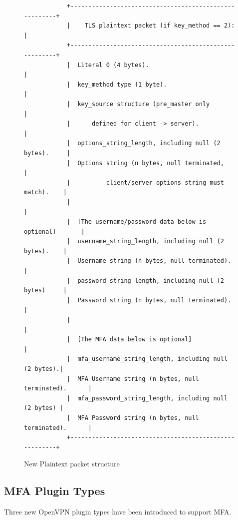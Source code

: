 \documentclass[11pt,oneside]{book}
\begin{document}
\begin{figure}[t]
    \label{MFA:New Packet}
    \centering
    \begin{verbatim}
            +-------------------------------------------------------+
            |    TLS plaintext packet (if key_method == 2):         |
            +-------------------------------------------------------+
            |  Literal 0 (4 bytes).                                 |
            |  key_method type (1 byte).                            |
            |  key_source structure (pre_master only                |
            |      defined for client -> server).                   |
            |  options_string_length, including null (2 bytes).     |
            |  Options string (n bytes, null terminated,            |
            |          client/server options string must match).    |
            |                                                       |
            |  [The username/password data below is optional]       |
            |  username_string_length, including null (2 bytes).    |
            |  Username string (n bytes, null terminated).          |
            |  password_string_length, including null (2 bytes)     |
            |  Password string (n bytes, null terminated).          |
            |                                                       |
            |  [The MFA data below is optional]                     |
            |  mfa_username_string_length, including null (2 bytes).|
            |  MFA Username string (n bytes, null terminated).      |
            |  mfa_password_string_length, including null (2 bytes) |
            |  MFA Password string (n bytes, null terminated).      |
            +-------------------------------------------------------+
    \end{verbatim}
    \vspace{-10mm}
    \caption{New Plaintext packet structure}
\end{figure}

\subsection{MFA Plugin Types}
\label{MFA:Types}
Three new OpenVPN plugin types have been introduced to support MFA.
\end{document}
